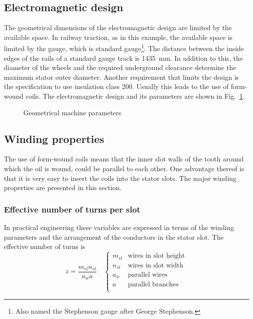 \subsection{Electromagnetic design}
The geometrical dimensions of the electromagnetic design are limited by the available space. In railway traction, as in this example, the available space is limited by the gauge, which is standard gauge\footnote{Also named the Stephenson gauge after George Stephenson.}. The distance between the inside edges of the rails of a standard gauge track is \SI{1435}{mm}. In addition to this, the diameter of the wheels and the required  underground clearance determine the maximum stator outer diameter. Another requirement that limits the design is the specification to use insulation class \num{200}. Usually this leads to the use of form-wound coils. The electromagnetic design and its parameters are shown in Fig.~\ref{fig:FEA_design}.
\begin{figure}[htbp]
	\centering
		
	\caption{Geometrical machine parameters}
	\label{fig:FEA_design}
\end{figure}

\subsection{Winding properties}
The use of form-wound coils means that the inner slot walls of the tooth around which the oil is wound, could be parallel to each other. One advantage thereof is that it is very easy to insert the coils into the stator slots. The major winding properties are presented in this section. 

\subsubsection{Effective number of turns per slot}
In practical engineering these variables are expressed in terms of the winding parameters and the arrangement of the conductors in the stator slot. The effective number of turns is 
\begin{equation}
  \label{eqn:z}
  z = \frac{m_{sl}n_{sl}}{a_w a}
  \quad
  \begin{cases}
  m_{sl} & \mbox{wires in slot height} \\
  n_{sl} & \mbox{wires in slot width}  \\
  a_w    & \mbox{parallel wires} \\
  a      & \mbox{parallel branches} \\
  \end{cases}
\end{equation} 

